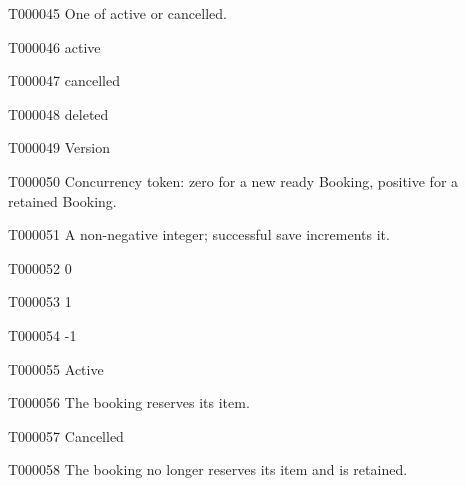 \documentclass[11pt,a4paper]{article}
\begin{document}
\begin{atlasparagraph}{T000045}
One of active or cancelled.
\end{atlasparagraph}
\begin{atlasitem}{T000046}
active
\end{atlasitem}
\begin{atlasitem}{T000047}
cancelled
\end{atlasitem}
\begin{atlasitem}{T000048}
deleted
\end{atlasitem}
\begin{atlastext}{T000049}
Version
\end{atlastext}
\begin{atlasparagraph}{T000050}
Concurrency token: zero for a new ready Booking, positive for a retained Booking.
\end{atlasparagraph}
\begin{atlasparagraph}{T000051}
A non-negative integer; successful save increments it.
\end{atlasparagraph}
\begin{atlasitem}{T000052}
0
\end{atlasitem}
\begin{atlasitem}{T000053}
1
\end{atlasitem}
\begin{atlasitem}{T000054}
-1
\end{atlasitem}
\begin{atlastext}{T000055}
Active
\end{atlastext}
\begin{atlasparagraph}{T000056}
The booking reserves its item.
\end{atlasparagraph}
\begin{atlastext}{T000057}
Cancelled
\end{atlastext}
\begin{atlasparagraph}{T000058}
The booking no longer reserves its item and is retained.
\end{atlasparagraph}
\end{document}
